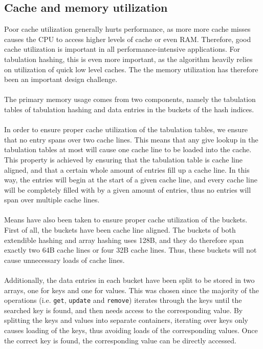 \documentclass[11pt]{article} %
\begin{document}

\subsection{Cache and memory utilization}
\label{subsec:design_cache_and_memory_utilization}
Poor cache utilization generally hurts performance, as more more cache misses causes the CPU to access higher levels of cache or even RAM. Therefore, good cache utilization is important in all performance-intensive applications. For tabulation hashing, this is even more important, as the algorithm heavily relies on utilization of quick low level caches. The the memory utilization has therefore been an important design challenge.\\
\\
The primary memory usage comes from two components, namely the tabulation tables of tabulation hashing and data entries in the buckets of the hash indices.\\
\\
In order to ensure proper cache utilization of the tabulation tables, we ensure that no entry spans over two cache lines. This means that any give lookup in the tabulation tables at most will cause one cache line to be loaded into the cache. This property is achieved by ensuring that the tabulation table is cache line aligned, and that a certain whole amount of entries fill up a cache line. In this way, the entries will begin at the start of a given cache line, and every cache line will be completely filled with by a given amount of entries, thus no entries will span over multiple cache lines. \\
\\
Means have also been taken to ensure proper cache utilization of the buckets. First of all, the buckets have been cache line aligned. The buckets of both extendible hashing and array hashing uses 128B, and they do therefore span exactly two 64B cache lines or four 32B cache lines. Thus, these buckets will not cause unnecessary loads of cache lines. \\
\\
Additionally, the data entries in each bucket have been split to be stored in two arrays, one for keys and one for values. This was chosen since the majority of the operations (i.e. \verb|get|, \verb|update| and \verb|remove|) iterates through the keys until the searched key is found, and then needs access to the corresponding value. By splitting the keys and values into separate containers, iterating over keys only causes loading of the keys, thus avoiding loads of the corresponding values. Once the correct key is found, the corresponding value can be directly accessed.
\end{document}

